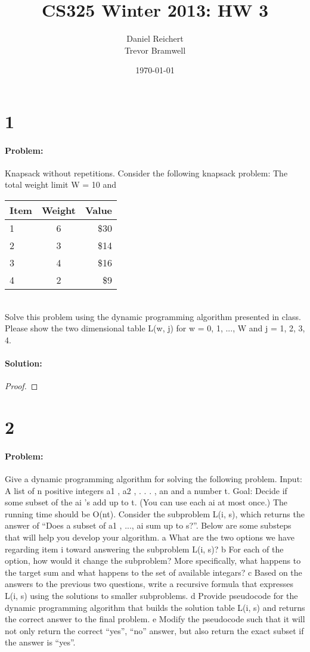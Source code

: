 \documentclass[12pt]{article}
\title{CS325 Winter 2013: HW 3}
\author{
    Daniel Reichert \\
    Trevor Bramwell \\
}
\date{\today}
\begin{document}
\maketitle
\section*{1}
\paragraph{Problem:}
Knapsack without repetitions. Consider the following knapsack problem:
The total weight limit W = 10 and \\
\begin{tabular}{ l | c | r }
    Item & Weight & Value \\ \hline
    1 & 6 & \$30 \\
    2 & 3 & \$14 \\
    3 & 4 & \$16 \\
    4 & 2 & \$9  \\ \hline
\end{tabular} \\
Solve this problem using the dynamic programming algorithm presented in class. Please show the two
dimensional table L(w, j) for w = 0, 1, ..., W and j = 1, 2, 3, 4.

\paragraph{Solution:}
\begin{proof}

\end{proof}

\section*{2}
\paragraph{Problem:}
Give a dynamic programming algorithm for solving the following problem.
Input: A list of n positive integers a1 , a2 , . . . , an and a number t.
Goal: Decide if some subset of the ai ’s add up to t. (You can use each ai at most once.)
The running time should be O(nt).
Consider the subproblem L(i, s), which returns the answer of “Does a subset of a1 , ..., ai sum up to s?”.
Below are some substeps that will help you develop your algorithm.
a What are the two options we have regarding item i toward answering the subproblem L(i, s)?
b For each of the option, how would it change the subproblem? More specifically, what happens to the
target sum and what happens to the set of available integars?
c Based on the answers to the previous two questions, write a recursive formula that expresses L(i, s)
using the solutions to smaller subproblems.
d Provide pseudocode for the dynamic programming algorithm that builds the solution table L(i, s) and
returns the correct answer to the final problem.
e Modify the pseudocode such that it will not only return the correct “yes”, “no” answer, but also return
the exact subset if the answer is “yes”.
\end{document}
